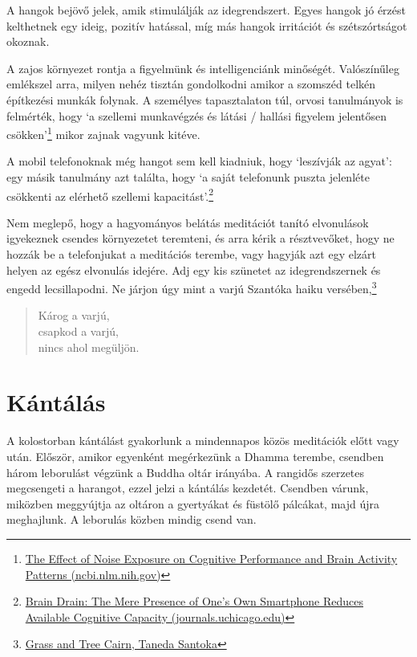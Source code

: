 A hangok bejövő jelek, amik stimulálják az idegrendszert. Egyes hangok
jó érzést kelthetnek egy ideig, pozitív hatással, míg más hangok
irritációt és szétszórtságot okoznak.

A zajos környezet rontja a figyelmünk és intelligenciánk minőségét.
Valószínűleg emlékszel arra, milyen nehéz tisztán gondolkodni amikor a
szomszéd telkén építkezési munkák folynak. A személyes tapasztalaton
túl, orvosi tanulmányok is felmérték, hogy `a szellemi munkavégzés és
látási / hallási figyelem jelentősen csökken'\footnote{\href{https://www.ncbi.nlm.nih.gov/pmc/articles/PMC6901841/}{The
  Effect of Noise Exposure on Cognitive Performance and Brain Activity
  Patterns (ncbi.nlm.nih.gov)}} mikor zajnak vagyunk kitéve.

A mobil telefonoknak még hangot sem kell kiadniuk, hogy `leszívják az
agyat': egy másik tanulmány azt találta, hogy `a saját telefonunk puszta
jelenléte csökkenti az elérhető szellemi kapacitást'.\footnote{\href{https://www.journals.uchicago.edu/doi/10.1086/691462}{Brain
  Drain: The Mere Presence of One's Own Smartphone Reduces Available
  Cognitive Capacity (journals.uchicago.edu)}}

Nem meglepő, hogy a hagyományos belátás meditációt tanító elvonulások
igyekeznek csendes környezetet teremteni, és arra kérik a résztvevőket,
hogy ne hozzák be a telefonjukat a meditációs terembe, vagy hagyják azt
egy elzárt helyen az egész elvonulás idejére. Adj egy kis szünetet az
idegrendszernek és engedd lecsillapodni. Ne járjon úgy mint a varjú
Szantóka haiku versében,\footnote{\href{https://www.goodreads.com/book/show/931086.Grass_and_Tree_Cairn}{Grass
  and Tree Cairn, Taneda Santoka}}

\begin{quote}
Károg a varjú,\\
csapkod a varjú,\\
nincs ahol megüljön.
\end{quote}

\section{Kántálás}


\noindent A kolostorban kántálást gyakorlunk a mindennapos közös
meditációk előtt vagy után. Először, amikor egyenként megérkezünk a
Dhamma terembe, csendben három leborulást végzünk a Buddha oltár
irányába. A rangidős szerzetes megcsengeti a harangot, ezzel jelzi a
kántálás kezdetét. Csendben várunk, miközben meggyújtja az oltáron a
gyertyákat és füstölő pálcákat, majd újra meghajlunk. A leborulás közben
mindig csend van.

